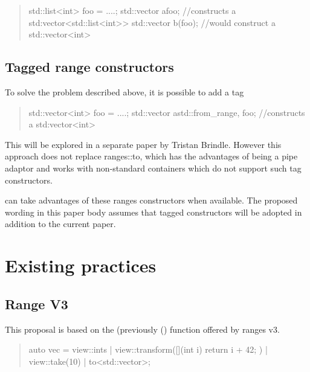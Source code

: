 \documentclass{wg21}
\begin{document}
\begin{quote}
\begin{colorblock}
std::list<int> foo = ....;
std::vector a{foo}; //constructs a std:vector<std::list<int>>
std::vector b(foo); //would construct a std::vector<int>
\end{colorblock}
\end{quote}

\subsection{Tagged range constructors}

To solve the problem described above, it is possible to add a tag

\begin{quote}
\begin{colorblock}
std::vector<int> foo = ....;
std::vector a{std::from_range, foo}; //constructs a std:vector<int>
\end{colorblock}
\end{quote}

This will be explored in a separate paper by Tristan Brindle.
However this approach does not replace ranges::to, which has the advantages of being a pipe adaptor and works with
non-standard containers which do not support such tag constructors.

 can take advantages of these ranges constructors when available.
The proposed wording in this paper body assumes that tagged constructors will be adopted in addition to the current paper. 


\section{Existing practices}


\subsection{Range V3}

This proposal is based on the  (previously () function offered by ranges v3.


\begin{quote}
	\begin{colorblock}
		auto vec = view::ints
		| view::transform([](int i) {
			return i + 42;
		})
		| view::take(10)
		| to<std::vector>;
	\end{colorblock}
\end{quote}
\end{document}
